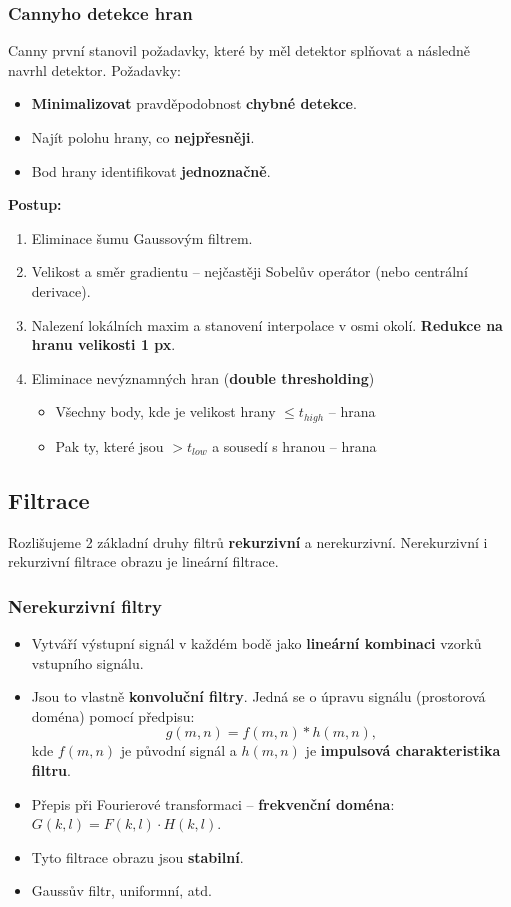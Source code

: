 \subsubsection{Cannyho detekce hran}
Canny první stanovil požadavky, které by měl detektor splňovat a následně navrhl detektor. %
Požadavky:
\begin{itemize}
	\item \textbf{Minimalizovat} pravděpodobnost \textbf{chybné detekce}.
	\item Najít polohu hrany, co \textbf{nejpřesněji}.
	\item Bod hrany identifikovat \textbf{jednoznačně}.
\end{itemize}
\textbf{Postup:}
\begin{enumerate}
	\item Eliminace šumu Gaussovým filtrem.
	\item Velikost a směr gradientu -- nejčastěji Sobelův operátor (nebo centrální derivace).
	\item Nalezení lokálních maxim a stanovení interpolace v osmi okolí. \textbf{Redukce na hranu velikosti 1 px}.
	\item Eliminace nevýznamných hran (\textbf{double thresholding})
	\begin{itemize}
		\item Všechny body, kde je velikost hrany $\leq t_{high}$ --  hrana
		\item Pak ty, které jsou $ > t_{low}$ a sousedí s hranou --  hrana
	\end{itemize}
\end{enumerate}

\subsection{Filtrace}
Rozlišujeme 2 základní druhy filtrů \textbf{rekurzivní} a nerekurzivní. Nerekurzivní i rekurzivní filtrace obrazu je lineární filtrace.

\subsubsection{Nerekurzivní filtry}
\begin{itemize}
\item Vytváří výstupní signál v každém bodě jako \textbf{lineární kombinaci} vzorků vstupního signálu.
\item Jsou to vlastně \textbf{konvoluční filtry}. Jedná se o úpravu signálu (prostorová doména) pomocí předpisu:
\begin{equation*}
g(m , n) = f(m, n) * h(m ,n),
\end{equation*}
kde $ f(m,n) $ je původní signál a $ h(m,n) $ je \textbf{impulsová charakteristika filtru}.
\item Přepis při Fourierové transformaci -- \textbf{frekvenční doména}: $G(k ,l)=F(k ,l) \cdot H (k ,l)$.
\item Tyto filtrace obrazu jsou \textbf{stabilní}.
\item Gaussův filtr, uniformní, atd.
\end{itemize}

